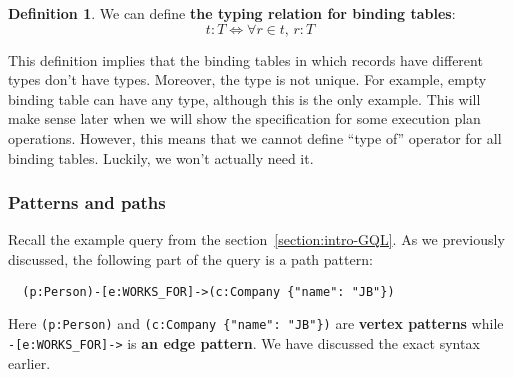 \documentclass[14pt]{constructor-thesis}
\theoremstyle{definition}
\newtheorem{definition}{Definition}
\begin{document}
\begin{definition}
  We can define \textbf{the typing relation for binding tables}:
  $$ t : T \Longleftrightarrow \forall r \in t, \, r : T $$
\end{definition}

This definition implies that the binding tables in which records have different types don't have types. Moreover, the type is not unique. For example, empty binding table can have any type, although this is the only example. This will make sense later when we will show the specification for some execution plan operations. However, this means that we cannot define ``type of'' operator for all binding tables. Luckily, we won't actually need it.

\subsubsection{Patterns and paths}
\label{sec:GQL-patterns-and-paths}

Recall the example query from the section~\ref{section:intro-GQL}. As we previously discussed, the following part of the query is a path pattern:
\begin{verbatim}
  (p:Person)-[e:WORKS_FOR]->(c:Company {"name": "JB"})
\end{verbatim}

Here \verb+(p:Person)+ and \verb+(c:Company {"name": "JB"})+ are \textbf{vertex patterns} while \verb+-[e:WORKS_FOR]->+ is \textbf{an edge pattern}. We have discussed the exact syntax earlier.



\end{document}
